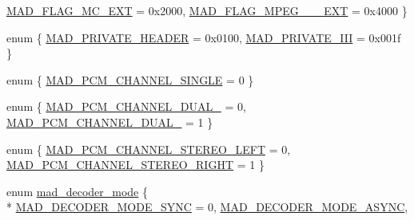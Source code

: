 \begin{DoxyCompactItemize}
\hyperlink{mac_2config_2i386_2lib-src_2libmad_2mad_8h_ab59c1bec446b10af208f977a871d910ba528d9a4b7522161be3007f1f75db51b0}{M\+A\+D\+\_\+\+F\+L\+A\+G\+\_\+\+M\+C\+\_\+\+E\+XT} = 0x2000, 
\hyperlink{mac_2config_2i386_2lib-src_2libmad_2mad_8h_ab59c1bec446b10af208f977a871d910baa3a9b72a0bc8246559527bdd3e368caa}{M\+A\+D\+\_\+\+F\+L\+A\+G\+\_\+\+M\+P\+E\+G\+\_\+\_\+\_\+\+E\+XT} = 0x4000
 \}
\item 
enum \{ \hyperlink{mac_2config_2i386_2lib-src_2libmad_2mad_8h_a456ac33d49271d3e2c371351cd1d6371a0ff8b422c34ae6b5e18445b9a6d29cca}{M\+A\+D\+\_\+\+P\+R\+I\+V\+A\+T\+E\+\_\+\+H\+E\+A\+D\+ER} = 0x0100, 
\hyperlink{mac_2config_2i386_2lib-src_2libmad_2mad_8h_a456ac33d49271d3e2c371351cd1d6371af758cc40b67b8026a690539980997422}{M\+A\+D\+\_\+\+P\+R\+I\+V\+A\+T\+E\+\_\+\+I\+II} = 0x001f
 \}
\item 
enum \{ \hyperlink{mac_2config_2i386_2lib-src_2libmad_2mad_8h_a07422cff4c3dd5075f91f87bd0e57ee7afae14beabc5daac23b169a27d1592161}{M\+A\+D\+\_\+\+P\+C\+M\+\_\+\+C\+H\+A\+N\+N\+E\+L\+\_\+\+S\+I\+N\+G\+LE} = 0
 \}
\item 
enum \{ \hyperlink{mac_2config_2i386_2lib-src_2libmad_2mad_8h_a905301dc85f7361d62f56f9dea55cf2ca96d03096fe786ca4ebd1c56783e215de}{M\+A\+D\+\_\+\+P\+C\+M\+\_\+\+C\+H\+A\+N\+N\+E\+L\+\_\+\+D\+U\+A\+L\+\_} = 0, 
\hyperlink{mac_2config_2i386_2lib-src_2libmad_2mad_8h_a905301dc85f7361d62f56f9dea55cf2ca0cb36fd87e1f82802bf7c770b5ed35f5}{M\+A\+D\+\_\+\+P\+C\+M\+\_\+\+C\+H\+A\+N\+N\+E\+L\+\_\+\+D\+U\+A\+L\+\_} = 1
 \}
\item 
enum \{ \hyperlink{mac_2config_2i386_2lib-src_2libmad_2mad_8h_a191c33aa19f004f13bed2b7be33756caa4eabf052fa0b2552b633c9a0cbed144b}{M\+A\+D\+\_\+\+P\+C\+M\+\_\+\+C\+H\+A\+N\+N\+E\+L\+\_\+\+S\+T\+E\+R\+E\+O\+\_\+\+L\+E\+FT} = 0, 
\hyperlink{mac_2config_2i386_2lib-src_2libmad_2mad_8h_a191c33aa19f004f13bed2b7be33756caa3947dd79b19e175a319de176c7c35f14}{M\+A\+D\+\_\+\+P\+C\+M\+\_\+\+C\+H\+A\+N\+N\+E\+L\+\_\+\+S\+T\+E\+R\+E\+O\+\_\+\+R\+I\+G\+HT} = 1
 \}
\item 
enum \hyperlink{mac_2config_2i386_2lib-src_2libmad_2mad_8h_a0d55d67e9f9acf69f677f86053e88b6a}{mad\+\_\+decoder\+\_\+mode} \{ \\*
\hyperlink{libmad_2decoder_8h_a0d55d67e9f9acf69f677f86053e88b6aa4670478d6f7c6dd89f794e9a87091ac2}{M\+A\+D\+\_\+\+D\+E\+C\+O\+D\+E\+R\+\_\+\+M\+O\+D\+E\+\_\+\+S\+Y\+NC} = 0, 
\hyperlink{libmad_2decoder_8h_a0d55d67e9f9acf69f677f86053e88b6aa0d44eb0cd37486eb0c2a67342423c8ca}{M\+A\+D\+\_\+\+D\+E\+C\+O\+D\+E\+R\+\_\+\+M\+O\+D\+E\+\_\+\+A\+S\+Y\+NC}, 

\end{DoxyCompactItemize}
